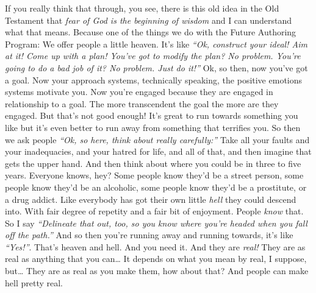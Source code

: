 \documentclass{memoir}
\newcommand{\qq}[1]{\emph{“#1”}}
\begin{document}
\begin{drama}
		If you really think that through, you see, there is this old idea in the Old Testament that \emph{fear of God is the beginning of wisdom} and I can understand what that means. Because one of the things we do with the Future Authoring Program: We offer people a little heaven. It's like \qq{Ok, construct your ideal! Aim at it! Come up with a plan! You've got to modify the plan? No problem. You're going to do a bad job of it? No problem. Just do it!} Ok, so then, now you've got a goal. Now your approach systems, technically speaking, the positive emotions systems motivate you. Now you're engaged because they are engaged in relationship to a goal. The more transcendent the goal the more are they engaged. But that's not good enough! It's great to run towards something you like but it's even better to run away from something that terrifies you. So then we ask people \qq{Ok, so here, think about really carefully:} Take all your faults and your inadequacies, and your hatred for life, and all of that, and then imagine that gets the upper hand. And then think about where you could be in three to five years. Everyone knows, hey? Some people know they'd be a street person, some people know they'd be an alcoholic, some people know they'd be a prostitute, or a drug addict. Like everybody has got their own little \emph{hell} they could descend into. With fair degree of repetity and a fair bit of enjoyment. People \emph{know} that. So I say \qq{Delineate that out, too, so you know where you're headed when you fall off the path.} And so then you're running away and running towards, it's like \qq{Yes!}. That's heaven and hell. And you need it. And they are \emph{real!} They are as real as anything that you can\ldots{} It depends on what you mean by real, I suppose, but\ldots{} They are as real as you make them, how about that? And people can make hell pretty real. 

\end{drama}
\end{document}

